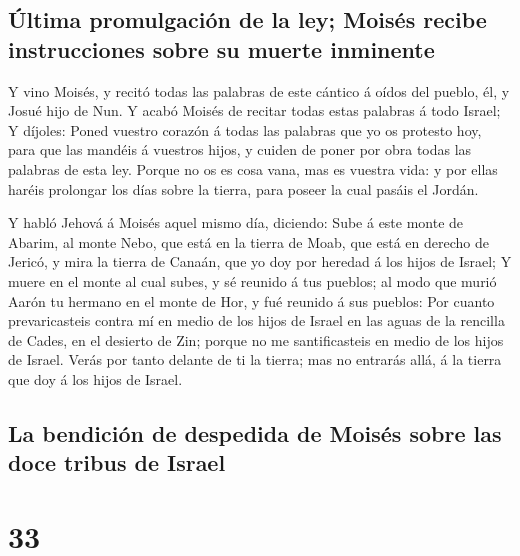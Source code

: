 \hypertarget{uxfaltima-promulgaciuxf3n-de-la-ley-moisuxe9s-recibe-instrucciones-sobre-su-muerte-inminente}{%
\subsection{Última promulgación de la ley; Moisés recibe instrucciones
sobre su muerte
inminente}\label{uxfaltima-promulgaciuxf3n-de-la-ley-moisuxe9s-recibe-instrucciones-sobre-su-muerte-inminente}}

 Y vino Moisés, y recitó todas las palabras de este
cántico á oídos del pueblo, él, y Josué hijo de Nun.  Y
acabó Moisés de recitar todas estas palabras á todo Israel;
 Y díjoles: Poned vuestro corazón á todas las palabras
que yo os protesto hoy, para que las mandéis á vuestros hijos, y cuiden
de poner por obra todas las palabras de esta ley.  Porque
no os es cosa vana, mas es vuestra vida: y por ellas haréis prolongar
los días sobre la tierra, para poseer la cual pasáis el Jordán.

 Y habló Jehová á Moisés aquel mismo día, diciendo:
 Sube á este monte de Abarim, al monte Nebo, que está en
la tierra de Moab, que está en derecho de Jericó, y mira la tierra de
Canaán, que yo doy por heredad á los hijos de Israel;  Y
muere en el monte al cual subes, y sé reunido á tus pueblos; al modo que
murió Aarón tu hermano en el monte de Hor, y fué reunido á sus pueblos:
 Por cuanto prevaricasteis contra mí en medio de los
hijos de Israel en las aguas de la rencilla de Cades, en el desierto de
Zin; porque no me santificasteis en medio de los hijos de Israel.
 Verás por tanto delante de ti la tierra; mas no entrarás
allá, á la tierra que doy á los hijos de Israel.

\hypertarget{la-bendiciuxf3n-de-despedida-de-moisuxe9s-sobre-las-doce-tribus-de-israel}{%
\subsection{La bendición de despedida de Moisés sobre las doce tribus de
Israel}\label{la-bendiciuxf3n-de-despedida-de-moisuxe9s-sobre-las-doce-tribus-de-israel}}

\hypertarget{section-32}{%
\section{33}\label{section-32}}

